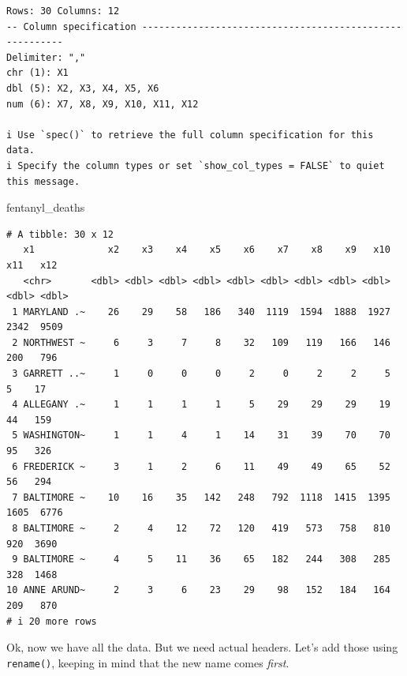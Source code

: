 \documentclass[
  letterpaper,
  DIV=11,
  numbers=noendperiod]{scrreprt}
\newenvironment{Shaded}{\begin{snugshade}}{\end{snugshade}}
\newcommand{\NormalTok}[1]{\textcolor[rgb]{0.00,0.23,0.31}{#1}}
\begin{document}
\begin{verbatim}
Rows: 30 Columns: 12
-- Column specification --------------------------------------------------------
Delimiter: ","
chr (1): X1
dbl (5): X2, X3, X4, X5, X6
num (6): X7, X8, X9, X10, X11, X12

i Use `spec()` to retrieve the full column specification for this data.
i Specify the column types or set `show_col_types = FALSE` to quiet this message.
\end{verbatim}

\begin{Shaded}
\begin{Highlighting}[]
\NormalTok{fentanyl\_deaths}
\end{Highlighting}
\end{Shaded}

\begin{verbatim}
# A tibble: 30 x 12
   x1             x2    x3    x4    x5    x6    x7    x8    x9   x10   x11   x12
   <chr>       <dbl> <dbl> <dbl> <dbl> <dbl> <dbl> <dbl> <dbl> <dbl> <dbl> <dbl>
 1 MARYLAND .~    26    29    58   186   340  1119  1594  1888  1927  2342  9509
 2 NORTHWEST ~     6     3     7     8    32   109   119   166   146   200   796
 3 GARRETT ..~     1     0     0     0     2     0     2     2     5     5    17
 4 ALLEGANY .~     1     1     1     1     5    29    29    29    19    44   159
 5 WASHINGTON~     1     1     4     1    14    31    39    70    70    95   326
 6 FREDERICK ~     3     1     2     6    11    49    49    65    52    56   294
 7 BALTIMORE ~    10    16    35   142   248   792  1118  1415  1395  1605  6776
 8 BALTIMORE ~     2     4    12    72   120   419   573   758   810   920  3690
 9 BALTIMORE ~     4     5    11    36    65   182   244   308   285   328  1468
10 ANNE ARUND~     2     3     6    23    29    98   152   184   164   209   870
# i 20 more rows
\end{verbatim}

Ok, now we have all the data. But we need actual headers. Let's add
those using \texttt{rename()}, keeping in mind that the new name comes
\emph{first}.
\end{document}
